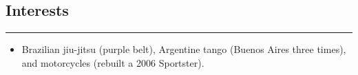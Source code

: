 \subsection*{Interests}
\hrule
\vspace{0.2cm}

\begin{itemize}
\item
Brazilian jiu-jitsu (purple belt),
Argentine tango (Buenos Aires three times),
and motorcycles (rebuilt a 2006 Sportster).
\end{itemize}
